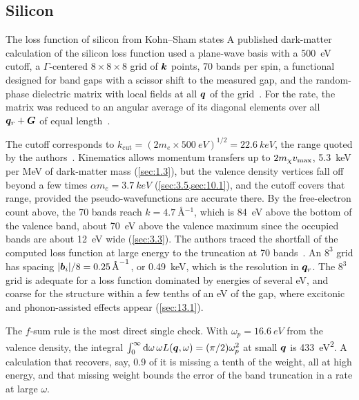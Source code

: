 \subsection{Silicon}

\begin{workedexample}{The loss function of silicon from Kohn--Sham states}\label{we:E-elf-si}
A published dark-matter calculation of the silicon loss function used a plane-wave basis with a \SI{500}{eV} cutoff, a $\Gamma$-centered $8\times8\times8$ grid of $\bm{k}$ points, 70 bands per spin, a functional designed for band gaps with a scissor shift to the measured gap, and the random-phase dielectric matrix with local fields at all $\bm{q}$ of the grid~\cite{knapen2021dark}. For the rate, the matrix was reduced to an angular average of its diagonal elements over all $\bm{q}_r + \bm{G}$ of equal length~\cite[Eq.~(24)]{knapen2021dark}.

The cutoff corresponds to $k_{\mathrm{cut}} = (2m_e\times\SI{500}{eV})^{1/2} = \SI{22.6}{keV}$, the range quoted by the authors~\cite{knapen2021dark}. Kinematics allows momentum transfers up to $2m_{\chi} v_{\mathrm{max}}$, \SI{5.3}{keV} per MeV of dark-matter mass (\cref{sec:1.3}), but the valence density vertices fall off beyond a few times $\alpha m_e = \SI{3.7}{keV}$ (\cref{sec:3.5,sec:10.1}), and the cutoff covers that range, provided the pseudo-wavefunctions are accurate there. By the free-electron count above, the 70 bands reach $k = \SI{4.7}{\angstrom^{-1}}$, which is \SI{84}{eV} above the bottom of the valence band, about \SI{70}{eV} above the valence maximum since the occupied bands are about \SI{12}{eV} wide (\cref{sec:3.3}). The authors traced the shortfall of the computed loss function at large energy to the truncation at 70 bands~\cite{knapen2021dark}. An $8^3$ grid has spacing $|\bm{b}_i|/8 = \SI{0.25}{\angstrom^{-1}}$, or \SI{0.49}{keV}, which is the resolution in $\bm{q}_r$. The $8^3$ grid is adequate for a loss function dominated by energies of several eV, and coarse for the structure within a few tenths of an eV of the gap, where excitonic and phonon-assisted effects appear (\cref{sec:13.1}).

The $f$-sum rule is the most direct single check. With $\omega_p = \SI{16.6}{eV}$ from the valence density, the integral $\int_0^\infty\mathrm{d}\omega\,\omega L(\bm{q},\omega) = (\pi/2)\omega_p^2$ at small $\bm{q}$ is \SI{433}{eV^2}. A calculation that recovers, say, 0.9 of it is missing a tenth of the weight, all at high energy, and that missing weight bounds the error of the band truncation in a rate at large $\omega$.
\end{workedexample}

